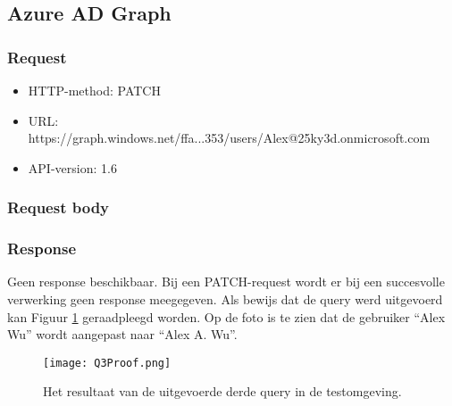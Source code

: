 \subsection{Azure AD Graph}

\subsubsection{Request}

\begin{itemize}
    \item \Ac{HTTP}-method: PATCH
    \item \ac{URL}: https://graph.windows.net/ffa...353/users/Alex@25ky3d.onmicrosoft.com
    \item \Ac{API}-version: 1.6
\end{itemize}

\subsubsection{Request body}


\subsubsection{Response}

Geen response beschikbaar. Bij een PATCH-request wordt er bij een succesvolle verwerking geen response meegegeven. Als bewijs dat de query werd uitgevoerd kan Figuur \ref{Q3Proof} geraadpleegd worden. Op de foto is te zien dat de gebruiker “Alex Wu” wordt aangepast naar “Alex A. Wu”. \\ 

\begin{figure}[h]
    \texttt{[image: Q3Proof.png]}
    \caption[Query 3: Bewijs van uitvoering]{Het resultaat van de uitgevoerde derde query in de testomgeving.}
    \label{Q3Proof}
\end{figure}

